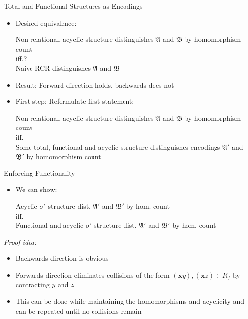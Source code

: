 \documentclass[aspectratio=169]{beamer}
\begin{document}
	\begin{frame}{Total and Functional Structures as Encodings}
		\begin{itemize}
			\item Desired equivalence: 
			\begin{center}
				Non-relational, acyclic structure distinguishes $\mathfrak A$ and $\mathfrak B$ by homomorphism count \\ 
				iff.? \\
				Naive RCR distinguishes $\mathfrak A$ and $\mathfrak B$
			\end{center}
			\item Result: Forward direction holds, backwards does not
			\item First step: Reformulate first statement:
			\begin{center}
				Non-relational, acyclic structure distinguishes $\mathfrak A$ and $\mathfrak B$ by homomorphism count\\
				iff.\\
				Some total, functional and acyclic structure distinguishes encodings $\mathfrak A'$ and $\mathfrak B'$ by homomorphism count
			\end{center}
		\end{itemize}
	\end{frame}
	
	\begin{frame}{Enforcing Functionality}
		\begin{itemize}
			\item We can show:
			\begin{center}
				Acyclic $\sigma'$-structure dist. $\mathfrak A'$ and $\mathfrak B'$ by hom. count \\
				iff. \\
				Functional and acyclic $\sigma'$-structure dist. $\mathfrak A'$ and $\mathfrak B'$ by hom. count
			\end{center}
		\end{itemize}
		\emph{Proof idea:}
		\begin{itemize}
			\item Backwards direction is obvious
			\item Forwards direction eliminates collisions of the form $(\mathbf xy),(\mathbf xz)\in R_f$ by contracting $y$ and $z$
			\item This can be done while maintaining the homomorphisms and acyclicity and can be repeated until no collisions remain
		\end{itemize}
	\end{frame}
	
\end{document}
